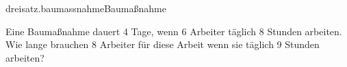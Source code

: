 \begin{exercise}{dreisatz.baumassnahme}{Baumaßnahme}
  \ifproblem\problem\par
    Eine Baumaßnahme dauert 4 Tage, wenn 6 Arbeiter täglich 8 Stunden arbeiten.
    Wie lange brauchen 8 Arbeiter für diese Arbeit wenn sie täglich 9 Stunden
    arbeiten?
  \fi
\end{exercise}

